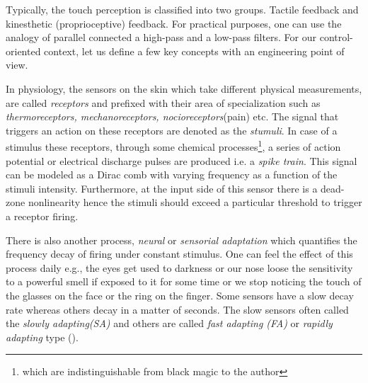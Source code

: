 Typically, the touch perception is classified into two groups. Tactile feedback and kinesthetic (proprioceptive) feedback. For practical purposes, one can use the analogy of parallel connected a high-pass and a low-pass filters. For our control-oriented context, let us define a few key concepts with an engineering point of view. 

In physiology, the sensors on the skin which take different physical measurements, are called \emph{receptors} and prefixed with their area of specialization such as \emph{thermoreceptors, mechanoreceptors, nocioreceptors}(pain) etc. The signal that triggers an action on these receptors are denoted as the \emph{stumuli}. In case of a stimulus these receptors, through some chemical processes\footnote{which are indistinguishable from black magic to the author}, a series of action potential or electrical discharge pulses are produced i.e. a \emph{spike train}. This signal can be modeled as a Dirac comb with varying frequency as a function of the stimuli intensity. Furthermore, at the input side of this sensor there is a dead-zone nonlinearity hence the stimuli should exceed a particular threshold to trigger a receptor firing.

There is also another process, \emph{neural} or \emph{sensorial adaptation} which quantifies the frequency decay of firing under constant stimulus. One can feel the effect of this process daily e.g., the eyes get used to darkness or our nose loose the sensitivity to a powerful smell if exposed to it for some time or we stop noticing the touch of the glasses on the face or the ring on the finger. Some sensors have a slow decay rate whereas others decay in a matter of seconds. The slow sensors often called the \emph{slowly adapting(SA)} and others are called \emph{fast adapting (FA)} or \emph{rapidly adapting} type (\cite{burdea}).



